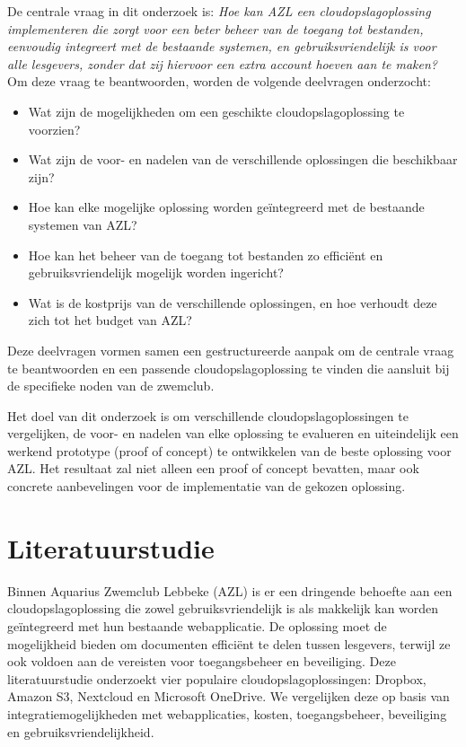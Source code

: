 De centrale vraag in dit onderzoek is: \textit{Hoe kan AZL een cloudopslagoplossing implementeren die zorgt voor een beter beheer van de 
toegang tot bestanden, eenvoudig integreert met de bestaande systemen, en gebruiksvriendelijk is voor alle lesgevers, zonder dat zij hiervoor 
een extra account hoeven aan te maken?} Om deze vraag te beantwoorden, worden de volgende deelvragen onderzocht:
\begin{itemize}
    \item Wat zijn de mogelijkheden om een geschikte cloudopslagoplossing te voorzien?
    \item Wat zijn de voor- en nadelen van de verschillende oplossingen die beschikbaar zijn?
    \item Hoe kan elke mogelijke oplossing worden geïntegreerd met de bestaande systemen van AZL?
    \item Hoe kan het beheer van de toegang tot bestanden zo efficiënt en gebruiksvriendelijk mogelijk worden ingericht?
    \item Wat is de kostprijs van de verschillende oplossingen, en hoe verhoudt deze zich tot het budget van AZL?
\end{itemize}
Deze deelvragen vormen samen een gestructureerde aanpak om de centrale vraag te beantwoorden en een passende cloudopslagoplossing 
te vinden die aansluit bij de specifieke noden van de zwemclub.

Het doel van dit onderzoek is om verschillende cloudopslagoplossingen te vergelijken, de voor- en nadelen van elke oplossing te evalueren en uiteindelijk een werkend prototype (proof of concept) te ontwikkelen van de beste oplossing voor AZL. Het resultaat zal niet alleen een proof of concept bevatten, maar ook concrete aanbevelingen voor de implementatie van de gekozen oplossing.


\section{Literatuurstudie}%
\label{sec:literatuurstudie}

Binnen Aquarius Zwemclub Lebbeke (AZL) is er een dringende behoefte aan een cloudopslagoplossing die zowel gebruiksvriendelijk is als makkelijk kan worden geïntegreerd met hun bestaande webapplicatie. De oplossing moet de mogelijkheid bieden om documenten efficiënt te delen tussen lesgevers, terwijl ze ook voldoen aan de vereisten voor toegangsbeheer en beveiliging. Deze literatuurstudie onderzoekt vier populaire cloudopslagoplossingen: Dropbox, Amazon S3, Nextcloud en Microsoft OneDrive. We vergelijken deze op basis van integratiemogelijkheden met webapplicaties, kosten, toegangsbeheer, beveiliging en gebruiksvriendelijkheid.

